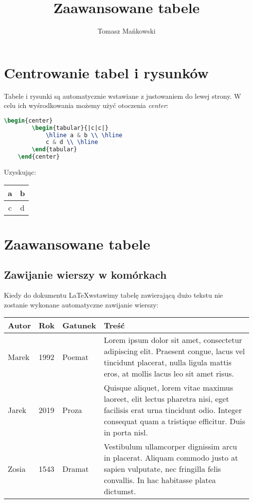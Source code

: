 \documentclass[10pt,a4paper]{article}
\author{Tomasz Mańkowski}
\title{Zaawansowane tabele}
\begin{document}
\maketitle

\tableofcontents

\section{Centrowanie tabel i rysunków}

Tabele i rysunki są automatycznie wstawiane z justowaniem do lewej strony. W celu ich wyśrodkowania możemy użyć otoczenia \emph{center}:

\begin{lstlisting}[language=TeX]
	\begin{center}
		\begin{tabular}{|c|c|}
			\hline a & b \\ \hline
			c & d \\ \hline
		\end{tabular}
	\end{center}
\end{lstlisting}

Uzyskując: 

\begin{center}
	\begin{tabular}{|c|c|}
		\hline a & b \\ \hline
		c & d \\ \hline
	\end{tabular}
\end{center}

\section{Zaawansowane tabele}

\subsection{Zawijanie wierszy w komórkach}

Kiedy do dokumentu \LaTeX wstawimy tabelę zawierającą dużo tekstu nie zostanie wykonane automatyczne zawijanie wierszy:

\begin{tabular}{| l | l | l | l |}
	\hline
	Autor & Rok & Gatunek & Treść \\ \hline
	Marek & 1992 & Poemat & Lorem ipsum dolor sit amet, consectetur adipiscing elit. Praesent congue, lacus vel tincidunt placerat, nulla ligula mattis eros, at mollis lacus leo sit amet risus. \\ \hline
	Jarek & 2019 & Proza & Quisque aliquet, lorem vitae maximus laoreet, elit lectus pharetra nisi, eget facilisis erat urna tincidunt odio. Integer consequat quam a tristique efficitur. Duis in porta nisl. \\ \hline
	Zosia & 1543 & Dramat & Vestibulum ullamcorper dignissim arcu in placerat. Aliquam commodo justo at sapien vulputate, nec fringilla felis convallis. In hac habitasse platea dictumst. \\
	\hline
\end{tabular}
\end{document}
